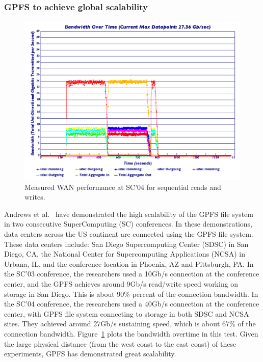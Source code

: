 \subsubsection{GPFS to achieve global scalability}
%
\begin{figure}
\centering
\includegraphics[width=0.99\columnwidth]{image/sc04.png}
\caption{Measured WAN performance at SC'04 for sequential reads and writes.}
\label{fig:sc04}
\end{figure}
%
Andrews et al.~\cite{Andrews2005} have demonstrated the high scalability 
of the GPFS file system in two consecutive SuperComputing (SC) conferences.
%
In these demonstrations, data centers across the US continent are connected
using the GPFS file system.
%
These data centers include: San Diego Supercomputing Center (SDSC) in San
Diego, CA,
the National Center for Supercomputing Applications (NCSA) in 
Urbana, IL, 
and the conference location in Phoenix, AZ and Pittsburgh, PA.
%
In the SC'03 conference, the researchers used a 10Gb/s connection at the 
conference center, and the GPFS achieves around 9Gb/s read/write speed working on 
storage in San Diego.
%
This is about 90\% percent of the connection bandwidth.
%
In the SC'04 conference, the researchers used a 40Gb/s connection at the 
conference center, with GPFS file system connecting to storage in both 
SDSC and NCSA sites.
%
They achieved around 27Gb/s sustaining speed, which is about 67\% of the 
connection bandwidth. 
%
Figure~\ref{fig:sc04} plots the bandwidth overtime in this test.
%
Given the large physical distance (from the west coast to the east coast)
of these experiments, GPFS has demonstrated great scalability.



